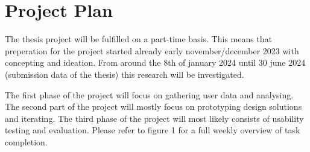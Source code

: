 \section{Project Plan}

The thesis project will be fulfilled on a part-time basis. This means that preperation for the project started already early november/december 2023 with concepting and ideation. From around the 8th of january 2024 until 30 june 2024 (submission data of the thesis) this research will be investigated.

The first phase of the project will focus on gathering user data and analysing. The second part of the project will mostly focus on prototyping design solutions and iterating. The third phase of the project will most likely consists of usability testing and evaluation. Please refer to figure 1 for a full weekly overview of task completion.